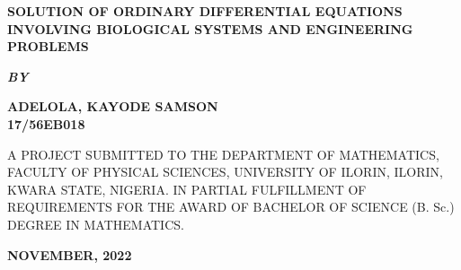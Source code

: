 \documentclass[11pt]{report}
\newcommand{\bt}[1]{\textbf{#1}}
\begin{document}
	
	\clearpage
	\thispagestyle{empty}
	\begin{center}
		\Large \bt{SOLUTION OF ORDINARY DIFFERENTIAL EQUATIONS INVOLVING BIOLOGICAL SYSTEMS AND ENGINEERING PROBLEMS}
	\end{center}

	\hspace{7cm}
	
	\begin{center}
		\textbf{\textit{BY}}
	\end{center}
	
	\hspace{5cm}
	
	\begin{center}
		\large \textbf{ADELOLA, KAYODE SAMSON
			\\
			17/56EB018}
	\end{center}
	
	\hspace{9cm}
	
	\begin{center}
		A PROJECT SUBMITTED TO THE DEPARTMENT OF MATHEMATICS, FACULTY OF PHYSICAL SCIENCES, UNIVERSITY OF ILORIN, ILORIN, KWARA STATE, NIGERIA. IN PARTIAL FULFILLMENT OF REQUIREMENTS FOR THE AWARD OF BACHELOR OF SCIENCE (B. Sc.) DEGREE IN MATHEMATICS.
	\end{center}

	\hspace{7cm}
	
	\begin{center}
		\textbf{NOVEMBER, 2022}
	\end{center}

	\newpage
\end{document}
